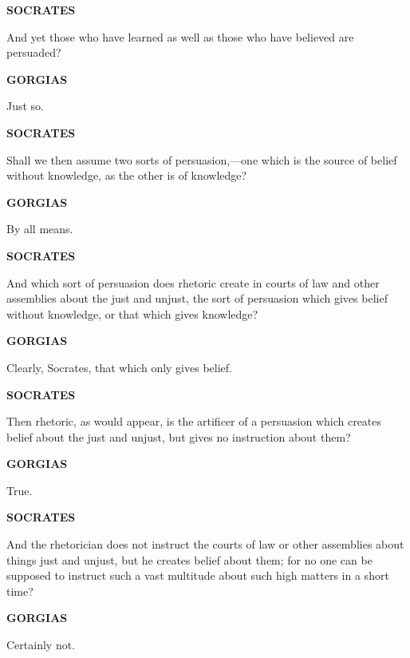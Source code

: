 \documentclass[11pt,letter]{article}
\begin{document}
\par \textbf{SOCRATES}
\par   And yet those who have learned as well as those who have believed are persuaded?

\par \textbf{GORGIAS}
\par   Just so.

\par \textbf{SOCRATES}
\par   Shall we then assume two sorts of persuasion,—one which is the source of belief without knowledge, as the other is of knowledge?

\par \textbf{GORGIAS}
\par   By all means.

\par \textbf{SOCRATES}
\par   And which sort of persuasion does rhetoric create in courts of law and other assemblies about the just and unjust, the sort of persuasion which gives belief without knowledge, or that which gives knowledge?

\par \textbf{GORGIAS}
\par   Clearly, Socrates, that which only gives belief.

\par \textbf{SOCRATES}
\par   Then rhetoric, as would appear, is the artificer of a persuasion which creates belief about the just and unjust, but gives no instruction about them?

\par \textbf{GORGIAS}
\par   True.

\par \textbf{SOCRATES}
\par   And the rhetorician does not instruct the courts of law or other assemblies about things just and unjust, but he creates belief about them; for no one can be supposed to instruct such a vast multitude about such high matters in a short time?

\par \textbf{GORGIAS}
\par   Certainly not.
\end{document}
